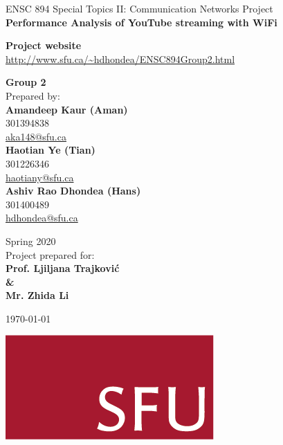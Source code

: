 \thispagestyle{empty}			
{\Large \begin{center}			
ENSC 894 Special Topics II: Communication Networks Project \\
\textbf{Performance Analysis of YouTube streaming with WiFi}
\vskip 23mm
\end{center}}

\begin{center}
	\textbf{Project website} \\
	\url{http://www.sfu.ca/~hdhondea/ENSC894Group2.html}
\end{center}

\begin{center}	
\textbf{Group 2} \\				
Prepared by:\\
\textbf{Amandeep Kaur (Aman)}\\
301394838\\
\url{aka148@sfu.ca} \\
\textbf{Haotian Ye (Tian)}\\
301226346\\
\url{haotiany@sfu.ca}\\
\textbf{Ashiv Rao Dhondea (Hans)}\\
301400489\\
\url{hdhondea@sfu.ca} 

\vskip 12mm
\vskip 5mm

Spring 2020\\Project prepared for:\\
\textbf{
Prof. Ljiljana Trajkovi\'{c}\\
\& \\
Mr. Zhida Li}
\end{center}

\begin{center}
	{\today}
\end{center}

\begin{center}				
	\includegraphics[scale = 1]{Figures/SFUogo.png}
\end{center}
